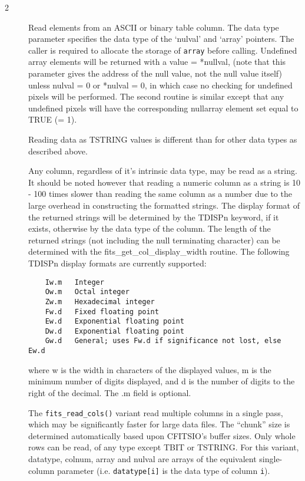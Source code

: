\documentclass[11pt]{book}
\begin{document}
\begin{description}
\item[2 ] Read elements from an ASCII or binary table column.  The data type
    parameter specifies the data type of the `nulval' and `array'  pointers.
    The caller is required to allocate the storage of \verb+array+ before calling.  
    Undefined array elements will be returned with a value = *nullval,
    (note that this parameter gives the address of the null value, not the
    null value itself) unless nulval = 0 or *nulval = 0, in which case
    no checking for undefined pixels will be performed.  The second
    routine is similar except that any undefined pixels will have the
    corresponding nullarray element set equal to TRUE (= 1).

    Reading data as TSTRING values is different than for other data types
    as described above.

    Any column, regardless of it's intrinsic data type, may be read as a
    string.  It should be noted however that reading a numeric column
    as a string is 10 - 100 times slower than reading the same column
    as a number due to the large overhead in constructing the formatted
    strings.  The display format of the returned strings will be
    determined by the TDISPn keyword, if it exists, otherwise by the
    data type of the column.  The length of the returned strings (not
    including the null terminating character) can be determined with
    the fits\_get\_col\_display\_width routine.  The following TDISPn
    display formats are currently supported:

\begin{verbatim}
    Iw.m   Integer
    Ow.m   Octal integer
    Zw.m   Hexadecimal integer
    Fw.d   Fixed floating point
    Ew.d   Exponential floating point
    Dw.d   Exponential floating point
    Gw.d   General; uses Fw.d if significance not lost, else Ew.d
\end{verbatim}
    where w is the width in characters of the displayed values, m is the minimum
    number of digits displayed, and d is the number of digits to the right of the
    decimal.  The .m field is optional.

   The \verb+fits_read_cols()+ variant read multiple columns in a
   single pass, which may be significantly faster for large data
   files.  The ``chunk'' size is determined automatically based upon
   CFITSIO's buffer sizes.  Only whole rows can be read, of any type
   except TBIT or TSTRING.  For this variant, datatype, colnum, array
   and nulval are arrays of the equivalent single-column parameter
   (i.e. \verb+datatype[i]+ is the data type of column \verb+i+).

   \label{ffgcv} \label{ffgcf} \label{ffgcvn}
\end{description}
\end{document}
